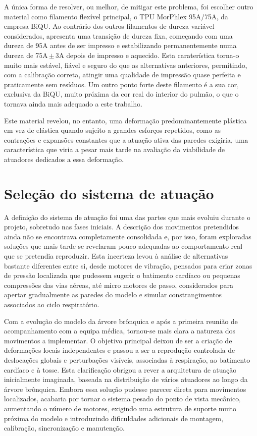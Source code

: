 A única forma de resolver, ou melhor, de mitigar este problema, foi escolher outro material como filamento flexível principal, o TPU MorPhlex 95A/75A, da empresa BiQU. Ao contrário dos outros filamentos de dureza variável considerados, apresenta uma transição de dureza fixa, começando com uma dureza de 95A antes de ser impresso e estabilizando permanentemente numa dureza de 75A\,$\pm$\,3A depois de impresso e aquecido. Esta caraterística torna-o muito mais estável, fiável e seguro do que as alternativas anteriores, permitindo, com a calibração correta, atingir uma qualidade de impressão quase perfeita e praticamente sem resíduos. Um outro ponto forte deste filamento é a sua cor, exclusiva da BiQU, muito próxima da cor real do interior do pulmão, o que o tornava ainda mais adequado a este trabalho.

Este material revelou, no entanto, uma deformação predominantemente plástica em vez de elástica quando sujeito a grandes esforços repetidos, como as contrações e expansões constantes que a atuação ativa das paredes exigiria, uma característica que viria a pesar mais tarde na avaliação da viabilidade de atuadores dedicados a essa deformação.

\section{Seleção do sistema de atuação}
\label{sec:selecao-atuacao}
A definição do sistema de atuação foi uma das partes que mais evoluiu durante o projeto, sobretudo nas fases iniciais. A descrição dos movimentos pretendidos ainda não se encontrava completamente consolidada e, por isso, foram exploradas soluções que mais tarde se revelaram pouco adequadas ao comportamento real que se pretendia reproduzir. Esta incerteza levou à análise de alternativas bastante diferentes entre si, desde motores de vibração, pensados para criar zonas de pressão localizada que pudessem sugerir o batimento cardíaco ou pequenas compressões das vias aéreas, até micro motores de passo, considerados para apertar gradualmente as paredes do modelo e simular constrangimentos associados ao ciclo respiratório.

Com a evolução do modelo da árvore brônquica e após a primeira reunião de acompanhamento com a equipa médica, tornou-se mais clara a natureza dos movimentos a implementar. O objetivo principal deixou de ser a criação de deformações locais independentes e passou a ser a reprodução controlada de deslocações globais e perturbações visíveis, associadas à respiração, ao batimento cardíaco e à tosse. Esta clarificação obrigou a rever a arquitetura de atuação inicialmente imaginada, baseada na distribuição de vários atuadores ao longo da árvore brônquica. Embora essa solução pudesse parecer direta para movimentos localizados, acabaria por tornar o sistema pesado do ponto de vista mecânico, aumentando o número de motores, exigindo uma estrutura de suporte muito próxima do modelo e introduzindo dificuldades adicionais de montagem, calibração, sincronização e manutenção.

